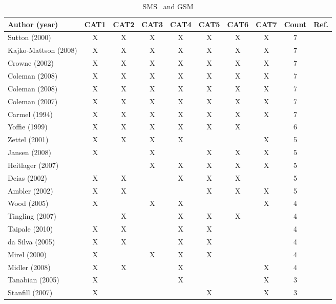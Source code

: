 \documentclass[10pt,journal,letterpaper,compsoc]{IEEEtran}
\begin{document}
\begin{table}[!t]
\renewcommand{\arraystretch}{1.3}
\caption{SMS~\cite{SMS} and GSM}
\label{tab:an:literature_comp}
\centering
\begin{tabular}{|l||c||c||c||c||c||c||c||c||c|}

\hline
Author (year) & CAT1 & CAT2 & CAT3 & CAT4 & CAT5 & CAT6 & CAT7 & Count & Ref. \\
\hline
Sutton (2000) & X & X & X & X & X & X & X & 7 & \cite{Sutton2000} \\
Kajko-Mattson (2008) & X & X & X & X & X & X & X & 7 &
\cite{Kajko-Mattsson2008} \\
Crowne (2002) & X & X & X & X & X & X & X & 7 & \cite{Crowne2002} \\
Coleman (2008) & X & X & X & X & X & X & X & 7 & \cite{Coleman2008a} \\
Coleman (2008) & X & X & X & X & X & X & X & 7 & \cite{Coleman2008} \\
Coleman (2007) & X & X & X & X & X & X & X & 7 & \cite{Coleman2007} \\
Carmel (1994) & X & X & X & X & X & X & X & 7 & \cite{Camel1994a} \\
Yoffie (1999) & X & X & X & X & X & X & & 6 & \cite{Yoffie1999} \\
Zettel (2001) & X & X & X & X & & & X & 5 & \cite{Zettel2001} \\
Jansen (2008) & X & & X & & X & X & X & 5 & \cite{Jansen2008} \\
Heitlager (2007) & & & X & X & X & X & X & 5 & \cite{Heitlager2007} \\
Deias (2002) & X & X & & X & X & X & & 5 & \cite{Deias} \\
Ambler (2002) & X & X & & & X & X & X & 5 & \cite{Ambler2002} \\
Wood (2005) & X & & X & X & & & X & 4 & \cite{Wood2005} \\
Tingling (2007) & & X & & X & X & X & & 4 & \cite{Tingling2007} \\
Taipale (2010) & X & X & & X & X & & & 4 & \cite{Taipale2010} \\
da Silva (2005) & X & X & & X & X & & & 4 & \cite{Silva2005} \\
Mirel (2000) & X & & X & X & X & & & 4 & \cite{Mirel2000} \\
Midler (2008) & X & X & & X & & & X & 4 & \cite{Midler2008} \\
Tanabian (2005) & X & & & X & & & X & 3 & \cite{Tanabian2005} \\
Stanfill (2007) & X & & & & X & & X & 3 & \cite{Stanfill2007} \\

\end{tabular}
\end{table}
\end{document}
